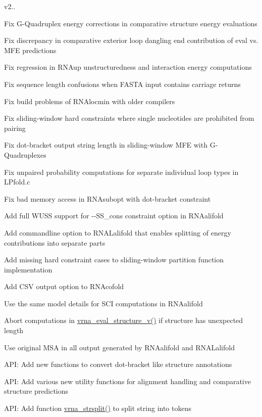 v2..
\begin{DoxyItemize}
\item Fix G-\/\+Quadruplex energy corrections in comparative structure energy evaluations
\item Fix discrepancy in comparative exterior loop dangling end contribution of eval vs. M\+FE predictions
\item Fix regression in R\+N\+Aup unstructuredness and interaction energy computations
\item Fix sequence length confusions when F\+A\+S\+TA input contains carriage returns
\item Fix build problems of R\+N\+Alocmin with older compilers
\item Fix sliding-\/window hard constraints where single nucleotides are prohibited from pairing
\item Fix dot-\/bracket output string length in sliding-\/window M\+FE with G-\/\+Quadruplexes
\item Fix unpaired probability computations for separate individual loop types in L\+Pfold.\+c
\item Fix bad memory access in R\+N\+Asubopt with dot-\/bracket constraint
\item Add full W\+U\+SS support for -\/-\/\+S\+S\+\_\+cons constraint option in R\+N\+Aalifold
\item Add commandline option to R\+N\+A\+Lalifold that enables splitting of energy contributions into separate parts
\item Add missing hard constraint cases to sliding-\/window partition function implementation
\item Add C\+SV output option to R\+N\+Acofold
\item Use the same model details for S\+CI computations in R\+N\+Aalifold
\item Abort computations in \hyperlink{group__eval_gab12e6b1226227670322150df018734f8}{vrna\+\_\+eval\+\_\+structure\+\_\+v()} if structure has unexpected length
\item Use original M\+SA in all output generated by R\+N\+Aalifold and R\+N\+A\+Lalifold
\item A\+PI\+: Add new functions to convert dot-\/bracket like structure annotations
\item A\+PI\+: Add various new utility functions for alignment handling and comparative structure predictions
\item A\+PI\+: Add function \hyperlink{group__string__utils_gac632775617f4b2df096bfe8efb53d07f}{vrna\+\_\+strsplit()} to split string into tokens

\end{DoxyItemize}
